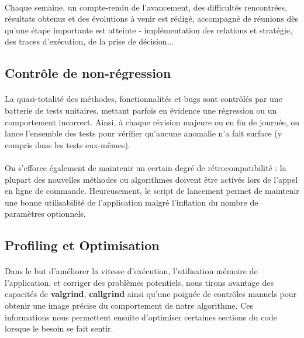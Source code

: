 \documentclass[a4paper,10pt]{report}
\begin{document}
\paragraph{}
  Chaque semaine, un compte-rendu de l'avancement, des difficultés rencontrées,
résultats obtenus et des évolutions à venir est rédigé, accompagné de réunions
dès qu'une étape importante est atteinte - implémentation des relations et
stratégie, des traces d'exécution, de la prise de décision...


\subsection{Contrôle de non-régression}
\paragraph{}
  La quasi-totalité des méthodes, fonctionnalités et bugs sont contrôlés par
une batterie de tests unitaires, mettant parfois en évidence une régression ou
un comportement incorrect. Ainsi, à chaque révision majeure ou en fin de
journée, on lance l'ensemble des tests pour vérifier qu'aucune anomalie n'a fait
surface (y compris dans les tests eux-mêmes).

\paragraph{}
  On s'efforce également de maintenir un certain degré de rétrocompatibilité
: la plupart des nouvelles méthodes ou algorithmes doivent être activés lors de
l'appel en ligne de commande. Heureusement, le script de lancement permet de
maintenir une bonne utilisabilité de l'application malgré l'inflation du nombre
de paramètres optionnels.

\subsection{Profiling et Optimisation}
\paragraph{}
  Dans le but d'améliorer la vitesse d'exécution, l'utilisation mémoire de
l'application, et corriger des problèmes potentiels, nous tirons avantage des
capacités de \textbf{valgrind}, \textbf{callgrind} ainsi qu'une poignée de
contrôles manuels pour obtenir une image précise du comportement de notre
algorithme. Ces informations nous permettent ensuite d'optimiser certaines
sections du code lorsque le besoin se fait sentir.
\end{document}
